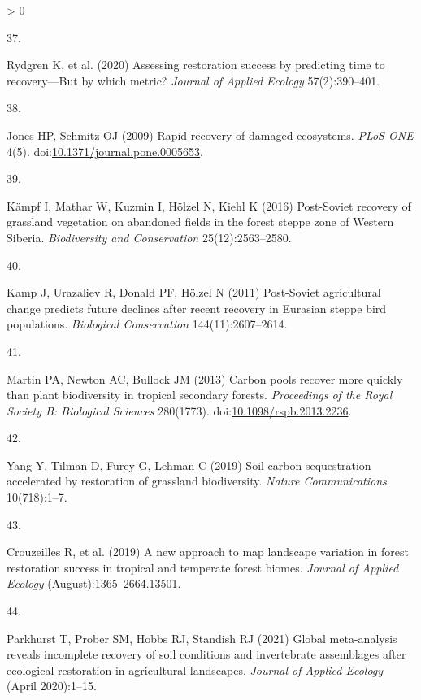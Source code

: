 \documentclass[9pt,twocolumn,twoside,lineno]{pnas-new}
\newlength{\csllabelwidth}
\newlength{\cslhangindent}
\newenvironment{CSLReferences}[2] %
 {%
  \setlength{\parindent}{0pt}
  \ifodd #1 \everypar{\setlength{\hangindent}{\cslhangindent}}\ignorespaces\fi
  \ifnum #2 > 0
  \setlength{\parskip}{#2\baselineskip}
  \fi
 }%
 {}
\newcommand{\CSLLeftMargin}[1]{\parbox[t]{\csllabelwidth}{#1}}
\newcommand{\CSLRightInline}[1]{\parbox[t]{\linewidth - \csllabelwidth}{#1}\break}
\begin{document}
\begin{CSLReferences}{0}{0}
\leavevmode\hypertarget{ref-Rydgren2020}{}%
\CSLLeftMargin{37. }
\CSLRightInline{Rydgren K, et al. (2020) {Assessing restoration success by predicting time to recovery---But by which metric?} \emph{Journal of Applied Ecology} 57(2):390--401.}

\leavevmode\hypertarget{ref-Jones2009}{}%
\CSLLeftMargin{38. }
\CSLRightInline{Jones HP, Schmitz OJ (2009) {Rapid recovery of damaged ecosystems}. \emph{PLoS ONE} 4(5). doi:\href{https://doi.org/10.1371/journal.pone.0005653}{10.1371/journal.pone.0005653}.}

\leavevmode\hypertarget{ref-Kampf2016}{}%
\CSLLeftMargin{39. }
\CSLRightInline{Kämpf I, Mathar W, Kuzmin I, Hölzel N, Kiehl K (2016) {Post-Soviet recovery of grassland vegetation on abandoned fields in the forest steppe zone of Western Siberia}. \emph{Biodiversity and Conservation} 25(12):2563--2580.}

\leavevmode\hypertarget{ref-Kamp2011}{}%
\CSLLeftMargin{40. }
\CSLRightInline{Kamp J, Urazaliev R, Donald PF, Hölzel N (2011) {Post-Soviet agricultural change predicts future declines after recent recovery in Eurasian steppe bird populations}. \emph{Biological Conservation} 144(11):2607--2614.}

\leavevmode\hypertarget{ref-Martin2013}{}%
\CSLLeftMargin{41. }
\CSLRightInline{Martin PA, Newton AC, Bullock JM (2013) {Carbon pools recover more quickly than plant biodiversity in tropical secondary forests}. \emph{Proceedings of the Royal Society B: Biological Sciences} 280(1773). doi:\href{https://doi.org/10.1098/rspb.2013.2236}{10.1098/rspb.2013.2236}.}

\leavevmode\hypertarget{ref-Yang2019}{}%
\CSLLeftMargin{42. }
\CSLRightInline{Yang Y, Tilman D, Furey G, Lehman C (2019) {Soil carbon sequestration accelerated by restoration of grassland biodiversity}. \emph{Nature Communications} 10(718):1--7.}

\leavevmode\hypertarget{ref-Crouzeilles2019}{}%
\CSLLeftMargin{43. }
\CSLRightInline{Crouzeilles R, et al. (2019) {A new approach to map landscape variation in forest restoration success in tropical and temperate forest biomes}. \emph{Journal of Applied Ecology} (August):1365--2664.13501.}

\leavevmode\hypertarget{ref-Parkhurst2021}{}%
\CSLLeftMargin{44. }
\CSLRightInline{Parkhurst T, Prober SM, Hobbs RJ, Standish RJ (2021) {Global meta-analysis reveals incomplete recovery of soil conditions and invertebrate assemblages after ecological restoration in agricultural landscapes}. \emph{Journal of Applied Ecology} (April 2020):1--15.}


\end{CSLReferences}
\end{document}
